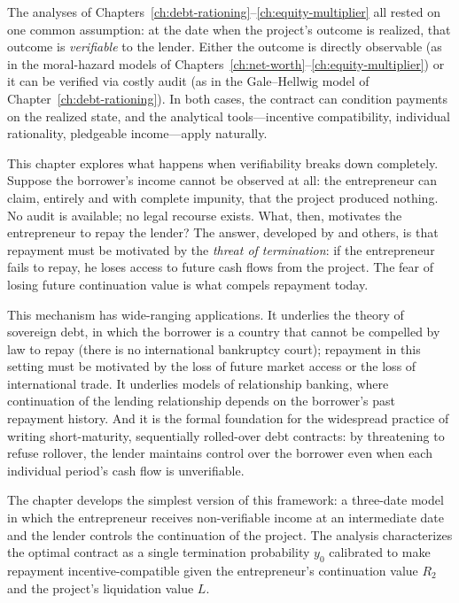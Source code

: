 \documentclass[11pt,a4paper,oneside]{book}
\theoremstyle{plain}
\theoremstyle{definition}
\theoremstyle{remark}
\numberwithin{equation}{chapter}
\begin{document}
The analyses of Chapters~\ref{ch:debt-rationing}--\ref{ch:equity-multiplier} all rested on one common assumption: at the date when the project's outcome is realized, that outcome is \emph{verifiable} to the lender.
Either the outcome is directly observable (as in the moral-hazard models of Chapters~\ref{ch:net-worth}--\ref{ch:equity-multiplier}) or it can be verified via costly audit (as in the Gale--Hellwig model of Chapter~\ref{ch:debt-rationing}).
In both cases, the contract can condition payments on the realized state, and the analytical tools---incentive compatibility, individual rationality, pledgeable income---apply naturally.

This chapter explores what happens when verifiability breaks down completely.
Suppose the borrower's income cannot be observed at all: the entrepreneur can claim, entirely and with complete impunity, that the project produced nothing.
No audit is available; no legal recourse exists.
What, then, motivates the entrepreneur to repay the lender?
The answer, developed by \citet{BoltonScharfstein1990} and others, is that repayment must be motivated by the \emph{threat of termination}: if the entrepreneur fails to repay, he loses access to future cash flows from the project.
The fear of losing future continuation value is what compels repayment today.

This mechanism has wide-ranging applications.
It underlies the theory of sovereign debt, in which the borrower is a country that cannot be compelled by law to repay (there is no international bankruptcy court); repayment in this setting must be motivated by the loss of future market access or the loss of international trade.
It underlies models of relationship banking, where continuation of the lending relationship depends on the borrower's past repayment history.
And it is the formal foundation for the widespread practice of writing short-maturity, sequentially rolled-over debt contracts: by threatening to refuse rollover, the lender maintains control over the borrower even when each individual period's cash flow is unverifiable.

The chapter develops the simplest version of this framework: a three-date model in which the entrepreneur receives non-verifiable income at an intermediate date and the lender controls the continuation of the project.
The analysis characterizes the optimal contract as a single termination probability $y_0$ calibrated to make repayment incentive-compatible given the entrepreneur's continuation value $R_2$ and the project's liquidation value $L$.
\end{document}

